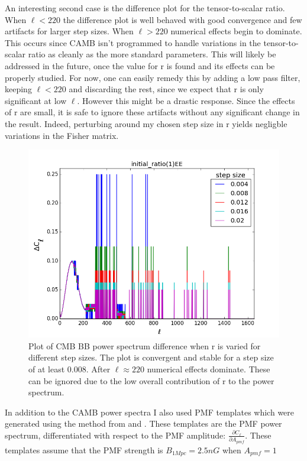 An interesting second case is the difference plot for the tensor-to-scalar ratio. When $\ell < 220$ the difference plot is well behaved with good convergence and few artifacts for larger step sizes. When $\ell > 220$ numerical effects begin to dominate. This occurs since CAMB isn't programmed to handle variations in the tensor-to-scalar ratio as cleanly as the more standard parameters. This will likely be addressed in the future, once the value for r is found and its effects can be properly studied. For now, one can easily remedy this by adding a low pass filter, keeping $\ell < 220$ and discarding the rest, since we expect that r is only significant at low $\ell$. However this might be a drastic response. Since the effects of r are small, it is safe to ignore these artifacts without any significant change in the result. Indeed, perturbing around my chosen step size in r yields negligble variations in the Fisher matrix.

\begin{figure}[h]
\centering
\includegraphics[scale=0.75]{images/diffs/reez.png}
\caption{Plot of CMB BB power spectrum difference when r is varied for different step sizes. The plot is convergent and stable for a step size of at least 0.008. After $\ell \approx 220$ numerical effects dominate. These can be ignored due to the low overall contribution of r to the power spectrum.}
\label{fig:diffr}
\end{figure}
 
 
In addition to the CAMB power spectra I also used PMF templates which were generated using the method from \cite{Ade:2015cao} and \cite{PhysRevD.80.023510}. These templates are the PMF power spectrum, differentiated with respect to the PMF amplitude: $\frac{\partial C_{\ell}}{\partial A_{pmf}}$.
These templates assume that the PMF strength is $B_{1Mpc} = 2.5nG$ when $A_{pmf} = 1$

